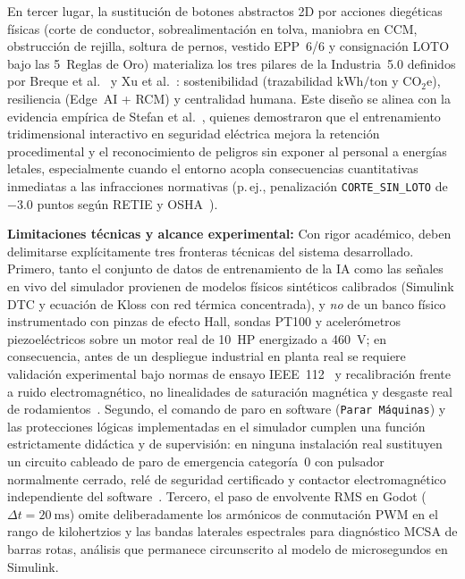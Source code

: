 En tercer lugar, la sustitución de botones abstractos 2D por acciones diegéticas físicas (corte de conductor, sobrealimentación en tolva, maniobra en CCM, obstrucción de rejilla, soltura de pernos, vestido EPP~6/6 y consignación LOTO bajo las 5~Reglas de Oro) materializa los tres pilares de la Industria~5.0 definidos por Breque et al.~\cite{Breque2021} y Xu et al.~\cite{Xu2021}: sostenibilidad (trazabilidad $\text{kWh/ton}$ y $\text{CO}_2\text{e}$), resiliencia (Edge~AI + RCM) y centralidad humana. Este diseño se alinea con la evidencia empírica de Stefan et al.~\cite{Stefan2023,Stefan2024}, quienes demostraron que el entrenamiento tridimensional interactivo en seguridad eléctrica mejora la retención procedimental y el reconocimiento de peligros sin exponer al personal a energías letales, especialmente cuando el entorno acopla consecuencias cuantitativas inmediatas a las infracciones normativas (p.\,ej., penalización \texttt{CORTE\_SIN\_LOTO} de $-\num{3.0}$ puntos según RETIE y OSHA~\cite{RETIE2026,OSHA1910,NFPA70E}).

\textbf{Limitaciones técnicas y alcance experimental:} Con rigor académico, deben delimitarse explícitamente tres fronteras técnicas del sistema desarrollado. Primero, tanto el conjunto de datos de entrenamiento de la IA como las señales en vivo del simulador provienen de modelos físicos sintéticos calibrados (Simulink DTC y ecuación de Kloss con red térmica concentrada), y \emph{no} de un banco físico instrumentado con pinzas de efecto Hall, sondas PT100 y acelerómetros piezoeléctricos sobre un motor real de \qty{10}{HP} energizado a \qty{460}{\volt}; en consecuencia, antes de un despliegue industrial en planta real se requiere validación experimental bajo normas de ensayo IEEE~112~\cite{IEEE112} y recalibración frente a ruido electromagnético, no linealidades de saturación magnética y desgaste real de rodamientos~\cite{AI2026}. Segundo, el comando de paro en software (\texttt{Parar Máquinas}) y las protecciones lógicas implementadas en el simulador cumplen una función estrictamente didáctica y de supervisión: en ninguna instalación real sustituyen un circuito cableado de paro de emergencia categoría~0 con pulsador normalmente cerrado, relé de seguridad certificado y contactor electromagnético independiente del software~\cite{RETIE2026,NFPA70E}. Tercero, el paso de envolvente RMS en Godot ($\Delta t=\qty{20}{\milli\second}$) omite deliberadamente los armónicos de conmutación PWM en el rango de kilohertzios y las bandas laterales espectrales para diagnóstico MCSA de barras rotas, análisis que permanece circunscrito al modelo de microsegundos en Simulink.
